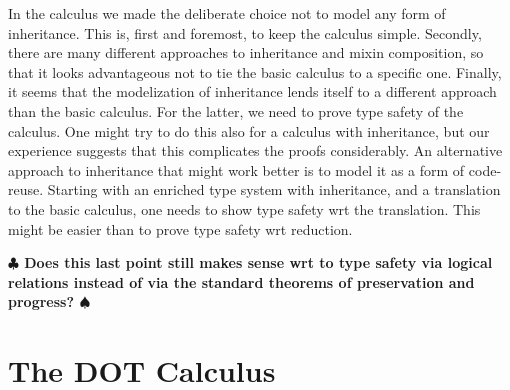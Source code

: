 \documentclass[9pt]{sigplanconf}
\newcommand{\remark}[1]{{\bf $\clubsuit$ #1 $\spadesuit$}}
\begin{document}
In the calculus we made the deliberate choice not to model any form of
inheritance. This is, first and foremost, to keep the calculus simple.
Secondly, there are many different approaches to inheritance and
mixin composition, so that it looks advantageous not to tie the basic
calculus to a specific one. Finally, it seems that the modelization of
inheritance lends itself to a different approach than the basic
calculus. For the latter, we need to prove type safety of the calculus.
One might try to do this also for a calculus with inheritance, but our
experience suggests that this complicates the proofs considerably.  An
alternative approach to inheritance that might work better is to model
it as a form of code-reuse. Starting with an enriched type system with
inheritance, and a translation to the basic calculus, one needs to
show type safety wrt the translation. This might be easier than
to prove type safety wrt reduction.

\remark{Does this last point still makes sense wrt to type safety via
  logical relations instead of via the standard theorems of
  preservation and progress?}

\section{The DOT Calculus}
\end{document}
